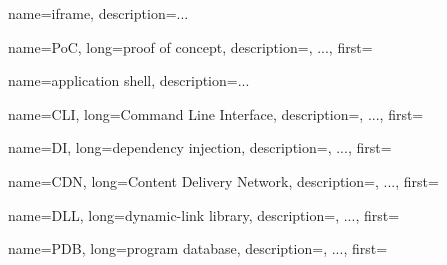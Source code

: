 {
    name=iframe,
    description={...}%
}

{
    name=PoC,
    long={proof of concept},
    description={, ...},%
    first=
}

{
    name={application shell},
    description={...}%
}


{
    name=CLI,
    long={Command Line Interface},
    description={, ...},%
    first=
}

{
    name=DI,
    long={dependency injection},
    description={, ...},%
    first=
}

{
    name=CDN,
    long={Content Delivery Network},
    description={, ...},%
    first=
}

{
    name=DLL,
    long={dynamic-link library},
    description={, ...},%
    first=
}

{
    name=PDB,
    long={program database},
    description={, ...},%
    first=
}
